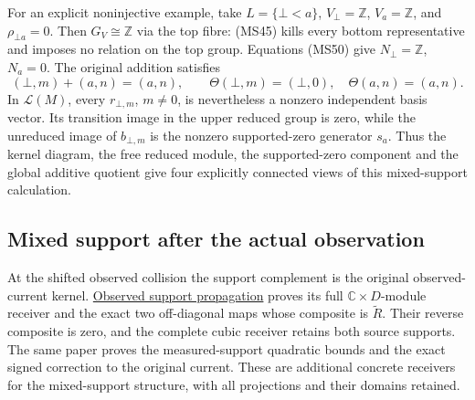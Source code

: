 \documentclass[
]{article}
\begin{document}
For an explicit noninjective example, take \(L=\{\bot<a\}\),
\(V_\bot=\mathbb Z\), \(V_a=\mathbb Z\), and \(\rho_{\bot a}=0\). Then
\(G_V\cong\mathbb Z\) via the top fibre: (MS45) kills every bottom
representative and imposes no relation on the top group. Equations
(MS50) give \(N_\bot=\mathbb Z\), \(N_a=0\). The original addition
satisfies \[
(\bot,m)+(a,n)=(a,n),
\qquad
\Theta(\bot,m)=(\bot,0),\quad
\Theta(a,n)=(a,n).
\tag{MS57}
\] In \(\mathscr L(M)\), every \(r_{\bot,m}\), \(m\ne0\), is
nevertheless a nonzero independent basis vector. Its transition image in
the upper reduced group is zero, while the unreduced image of
\(b_{\bot,m}\) is the nonzero supported-zero generator \(s_a\). Thus the
kernel diagram, the free reduced module, the supported-zero component
and the global additive quotient give four explicitly connected views of
this mixed-support calculation.

\subsection{Mixed support after the actual
observation}\label{mixed-support-after-the-actual-observation}

At the shifted observed collision the support complement is the original
observed-current kernel.
\href{https://github.com/KokunoYumeto/zeta-function-research-reader/blob/c9df443d9e1df000dfbb083943f97197e746eb08/workbenches/splitzero-tandem/branches/identity-absorber-square/OBSERVED_SUPPORT_PROPAGATION.md}{Observed
support propagation} proves its full \(\mathbb C\times D\)-module
receiver and the exact two off-diagonal maps whose composite is
\(\widetilde R\). Their reverse composite is zero, and the complete
cubic receiver retains both source supports. The same paper proves the
measured-support quadratic bounds and the exact signed correction to the
original current. These are additional concrete receivers for the
mixed-support structure, with all projections and their domains
retained.
\end{document}
